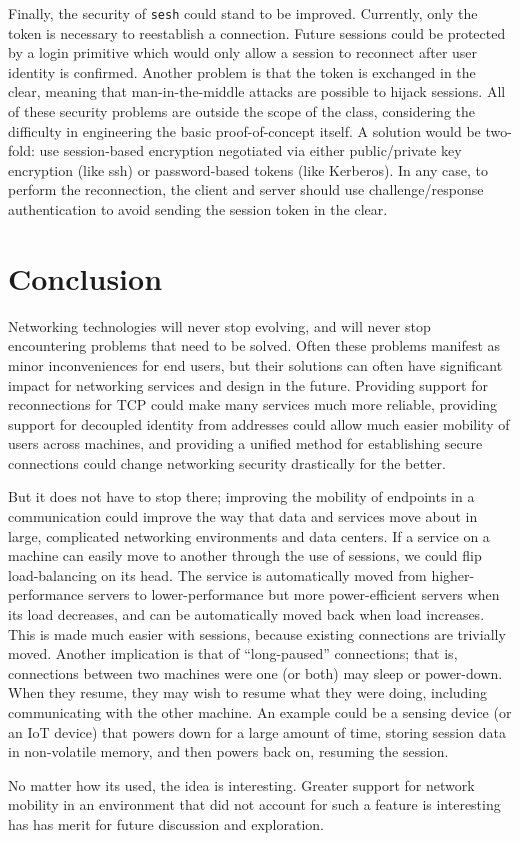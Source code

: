 \documentclass[twocolumn,10pt]{article}
\newcommand{\sesh}{\texttt{sesh}\xspace}
\begin{document}
Finally, the security of \sesh could stand to be improved. Currently, only the
token is necessary to reestablish a connection. Future sessions could be
protected by a login primitive which would only allow a session to reconnect
after user identity is confirmed. Another problem is that the token is exchanged
in the clear, meaning that man-in-the-middle attacks are possible to hijack
sessions. All of these security problems are outside the scope of the class,
considering the difficulty in engineering the basic proof-of-concept itself. A
solution would be two-fold: use session-based encryption negotiated via either
public/private key encryption (like ssh) or password-based tokens (like
Kerberos). In any case, to perform the reconnection, the client and server
should use challenge/response authentication to avoid sending the session token
in the clear.

\section{Conclusion}

Networking technologies will never stop evolving, and will never stop
encountering problems that need to be solved. Often these problems manifest as
minor inconveniences for end users, but their solutions can often have
significant impact for networking services and design in the future. Providing
support for reconnections for TCP could make many services much more reliable,
providing support for decoupled identity from addresses could allow much easier
mobility of users across machines, and providing a unified method for
establishing secure connections could change networking security drastically for
the better.

But it does not have to stop there; improving the mobility of
endpoints in a communication could improve the way that data and services move
about in large, complicated networking environments and data centers. If a
service on a machine can easily move to another through the use of sessions, we
could flip load-balancing on its head. The service is automatically moved from
higher-performance servers to lower-performance but more power-efficient servers
when its load decreases, and can be automatically moved back when load
increases. This is made much easier with sessions, because existing connections
are trivially moved. Another implication is that of ``long-paused'' connections;
that is, connections between two machines were one (or both) may sleep or
power-down. When they resume, they may wish to resume what they were doing,
including communicating with the other machine. An example could be a sensing
device (or an IoT device) that powers down for a large amount of time, storing
session data in non-volatile memory, and then powers back on, resuming the
session.

No matter how its used, the idea is interesting. Greater support for network
mobility in an environment that did not account for such a feature is
interesting has has merit for future discussion and exploration.












\end{document}

